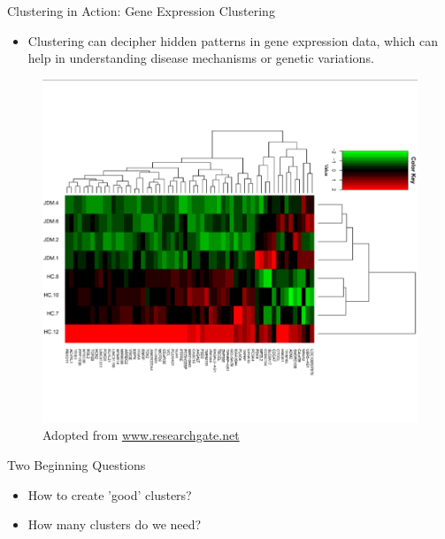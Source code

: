 \documentclass[serif, aspectratio=169]{beamer}
\begin{document}
\begin{frame}{Clustering in Action: Gene Expression Clustering}
\begin{itemize}
    \item Clustering can decipher hidden patterns in gene expression data, which can help in understanding disease mechanisms or genetic variations.
\end{itemize}
    \begin{figure}
        \centering
        \includegraphics[scale=0.35]{pic/figs/Unsupervised-hierarchical-clustering-analysis-of-gene-expression.png}
         {\scriptsize Adopted from \href{https://www.researchgate.net/publication/334433467_Plasma_exosomes_from_children_with_juvenile_dermatomyositis_are_taken_up_by_human_aortic_endothelial_cells_and_are_associated_with_altered_gene_expression_in_those_cells}{www.researchgate.net}}
        
    \end{figure}
    
\end{frame}

\begin{frame}{Two Beginning Questions}
    \begin{itemize}

\item How to create 'good' clusters?
\item How many clusters do we need?

    \end{itemize}
\end{frame}
\end{document}
